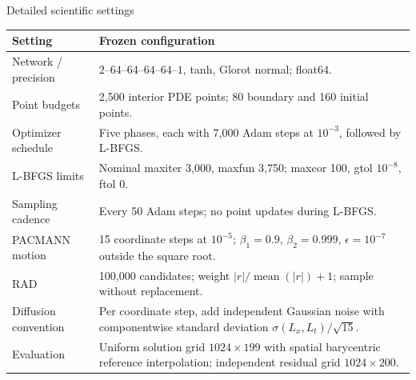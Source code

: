 \documentclass[aspectratio=169,11pt]{beamer}
\begin{document}
\begin{frame}{Detailed scientific settings}
  \footnotesize
  \begin{tabular}{@{}p{}p{}@{}}
    \toprule
    Setting & Frozen configuration \\
    \midrule
    Network / precision & $2$--$64$--$64$--$64$--$64$--$1$, tanh, Glorot normal;
      float64. \\
    Point budgets & 2,500 interior PDE points; 80 boundary and 160 initial points. \\
    Optimizer schedule & Five phases, each with 7,000 Adam steps at $10^{-3}$,
      followed by L-BFGS. \\
    L-BFGS limits & Nominal maxiter 3,000, maxfun 3,750; maxcor 100,
      gtol $10^{-8}$, ftol 0. \\
    Sampling cadence & Every 50 Adam steps; no point updates during L-BFGS. \\
    PACMANN motion & 15 coordinate steps at $10^{-5}$;
      $\beta_1=0.9$, $\beta_2=0.999$, $\epsilon=10^{-7}$ outside the square root. \\
    RAD & 100,000 candidates; weight $|r|/\operatorname{mean}(|r|)+1$;
      sample without replacement. \\
    Diffusion convention & Per coordinate step, add independent Gaussian noise
      with componentwise standard deviation $\sigma (L_x,L_t)/\sqrt{15}$. \\
    Evaluation & Uniform solution grid $1024\times199$ with spatial barycentric
      reference interpolation; independent residual grid $1024\times200$. \\
    \bottomrule
  \end{tabular}
\end{frame}
\end{document}
